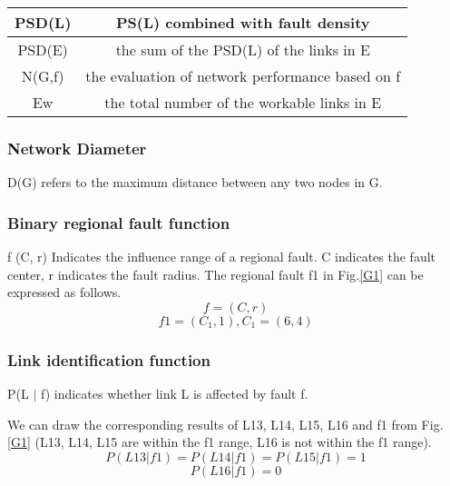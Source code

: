 \documentclass[journal]{IEEEtran}
\begin{document}
\begin{table}[htbp]
\begin{tabular}{@{}
>{\columncolor[HTML]{FFFFFF}}c 
>{\columncolor[HTML]{FFFFFF}}c @{}}
PSD(L)     & PS(L) combined with fault density                                                                                                \\ \midrule
PSD(E)       & the sum of the PSD(L) of the links in E                                                                                                          \\ \midrule
N(G,f)       & the evaluation of network performance based on f                                                                                                     \\ \midrule
Ew       & the  total number of the workable links in E                                                                                                          \\ \bottomrule


\end{tabular}
\end{table}

\subsubsection{Network Diameter} D(G) refers to the maximum distance between any two nodes in G.

\subsubsection{Binary regional fault function}f (C, r) Indicates the influence range of a regional fault. C indicates the fault center, r indicates the fault radius. The regional fault f1 in Fig.\ref{G1}  can be expressed as follows.
\begin{equation}
f = (C,r)
\end{equation}
\begin{equation}
f1=\left ( C_{1}, 1 \right ),C_{1} = \left ( 6, 4 \right )
\end{equation}
\subsubsection{Link identification function} P(L $|$ f) indicates whether link L is affected by fault f.



\par We can draw the corresponding results of L13, L14, L15, L16 and f1 from Fig.\ref{G1} (L13, L14, L15 are within the f1 range, L16 is not within the f1 range).
\begin{equation}
P(L13|f1) = P(L14|f1) = P(L15|f1) = 1
\end{equation}
\begin{equation}
P(L16|f1) = 0
\end{equation}
\end{document}
